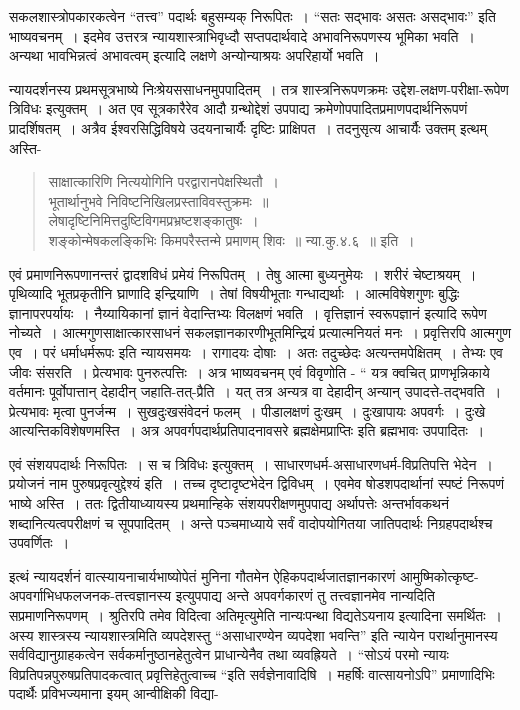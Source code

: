 {सकलशास्त्रोपकारकत्वेन “तत्त्व” पदार्थः बहुसम्यक् निरूपितः~। “सतः सद्भावः असतः असद्भावः” इति भाष्यवचनम्~। इदमेव उत्तरत्र न्यायशास्त्राभिवृध्दौ सप्तपदार्थवादे अभावनिरूपणस्य भूमिका भवति~। अन्यथा भावभिन्नत्वं अभावत्वम् इत्यादि लक्षणे अन्योन्याश्रयः अपरिहार्यो भवति~। 

न्यायदर्शनस्य प्रथमसूत्रभाष्ये निःश्रेयससाधनमुपपादितम्~। तत्र शास्त्रनिरूपणक्रमः उद्देश-लक्षण-परीक्षा-रूपेण त्रिविधः इत्युक्तम्~। अत एव सूत्रकारैरेव आदौ ग्रन्थोद्देशं उपपाद्य क्रमेणोपपादितप्रमाणपदार्थनिरूपणं प्रादर्शिषतम्~। अत्रैव ईश्वरसिद्धिविषये उदयनाचार्यैः दृष्टिः प्राक्षिपत~। तदनुसृत्य आचार्यैः उक्तम् इत्थम् अस्ति-

\begin{verse}
साक्षात्कारिणि नित्ययोगिनि परद्वारानपेक्षस्थितौ~। \\
भूतार्थानुभवे निविष्टनिखिलप्रस्ताविवस्तुक्रमः~॥\\
लेषादृष्टिनिमित्तदुष्टिविगमप्रभ्रष्टशङ्कातुषः~। \\
शङ्कोन्मेषकलङ्किभिः किमपरैस्तन्मे प्रमाणम् शिवः~॥ न्या.कु.४.६~॥ इति~। 
\end{verse}

एवं प्रमाणनिरूपणानन्तरं द्वादशविधं प्रमेयं निरूपितम्~। तेषु आत्मा बुध्यनुमेयः~। शरीरं चेष्टाश्रयम्~। पृथिव्यादि भूतप्रकृतीनि घ्राणादि इन्द्रियाणि~। तेषां विषयीभूताः गन्धाद्यर्थाः~। आत्मविषेशगुणः बुद्धिः ज्ञानापरपर्यायः~। नैय्यायिकानां ज्ञानं वेदान्तिभ्यः विलक्षणं भवति~। वृत्तिज्ञानं स्वरूपज्ञानं इत्यादि रूपेण नोच्यते~। आत्मगुणसाक्षात्कारसाधनं सकलज्ञानकारणीभूतमिन्द्रियं प्रत्यात्मनियतं मनः~। प्रवृत्तिरपि आत्मगुण एव~। परं धर्माधर्मरूपः इति न्यायसमयः~। रागादयः दोषाः~। अतः तदुच्छेदः अत्यन्तमपेक्षितम्~। तेभ्यः एव जीवः संसरति~। प्रेत्यभावः पुनरुत्पत्तिः~। अत्र भाष्यवचनम् एवं विवृणोति - “ यत्र क्वचित् प्राणभृन्निकाये वर्तमानः पूर्वोपात्तान् देहादीन् जहाति-तत्-प्रैति~। यत् तत्र अन्यत्र वा देहादीन् अन्यान् उपादत्ते-तद्भवति~। प्रेत्यभावः मृत्वा पुनर्जन्म~। सुखदुःखसंवेदनं फलम्~। पीडालक्षणं दुःखम्~। दुःखापायः अपवर्गः~। दुःखे आत्यन्तिकविशेषणमस्ति~। अत्र अपवर्गपदार्थप्रतिपादनावसरे ब्रह्मक्षेमप्राप्तिः इति ब्रह्मभावः उपपादितः~। 

एवं संशयपदार्थः निरूपितः~। स च त्रिविधः इत्युक्तम्~। साधारणधर्म-असाधारणधर्म-विप्रतिपत्ति भेदेन~। प्रयोजनं नाम पुरुषप्रवृत्युद्देश्यं इति~। तच्च दृष्टादृष्टभेदेन द्विविधम्~। एवमेव षोडशपदार्थानां स्पष्टं निरूपणं भाष्ये अस्ति~। ततः द्वितीयाध्यायस्य प्रथमान्हिके संशयपरीक्षणमुपपाद्य अर्थापत्तेः अन्तर्भावकथनं शब्दानित्यत्वपरीक्षणं च सूपपादितम्~। अन्ते पञ्चमाध्याये सर्वं वादोपयोगितया जातिपदार्थः निग्रहपदार्थश्च उपवर्णितः~। 

इत्थं न्यायदर्शनं वात्स्यायनाचार्यभाष्योपेतं मुनिना गौतमेन ऐहिकपदार्थजातज्ञान\-कारणं आमुष्मिकोत्कृष्ट-अपवर्गाभिधफलजनक-तत्त्वज्ञानस्य इत्युपपाद्य अन्ते अपवर्गकारणं तु \break तत्त्वज्ञानमेव नान्यदिति सप्रमाणनिरूपणम्~। श्रुतिरपि तमेव विदित्वा अतिमृत्युमेति नान्यः\-पन्था विद्यतेऽयनाय इत्यादिना समर्थितः~।  अस्य शास्त्रस्य न्यायशास्त्रमिति व्यपदेशस्तु \-“असाधारण्येन व्यपदेशा भवन्ति” इति न्यायेन परार्थानुमानस्य सर्वविद्यानुग्राहकत्वेन \break सर्वकर्मानुष्ठानहेतुत्वेन प्राधान्येनैव तथा व्यवह्रियते~। “सोऽयं परमो न्यायः विप्रतिपन्न\-पुरुषप्रतिपादकत्वात् प्रवृत्तिहेतुत्वाच्च “इति सर्वज्ञेनावादिषि~। महर्षिः वात्सायनोऽपि” प्रमाणादिभिः पदार्थैः प्रविभज्यमाना इयम् आन्वीक्षिकी विद्या-

}
